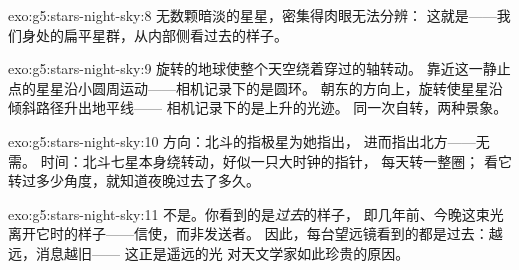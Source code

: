 \begin{solution}{exo:g5:stars-night-sky:8}
无数颗暗淡的星星，密集得肉眼无法分辨：
这就是——我们身处的扁平星群，从内部侧看过去的样子。
\end{solution}

\begin{solution}{exo:g5:stars-night-sky:9}
旋转的地球使整个天空绕着穿过的轴转动。
靠近这一静止点的星星沿小圆周运动——相机记录下的是圆环。
朝东的方向上，旋转使星星沿倾斜路径升出地平线——
相机记录下的是上升的光迹。
同一次自转，两种景象。
\end{solution}

\begin{solution}{exo:g5:stars-night-sky:10}
方向：北斗的指极星为她指出，
进而指出北方——无需。
时间：北斗七星本身绕转动，好似一只大时钟的指针，
每天转一整圈；
看它转过多少角度，就知道夜晚过去了多久。
\end{solution}

\begin{solution}{exo:g5:stars-night-sky:11}
不是。你看到的是\emph{过去}的样子，
即几年前、今晚这束光离开它时的样子——信使，而非发送者。
因此，每台望远镜看到的都是过去：越远，消息越旧——
这正是遥远的光
对天文学家如此珍贵的原因。
\end{solution}
